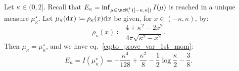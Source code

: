 \begin{proposition}
    \label{prop:mukappa_value}
    Let $\kappa \in (0,2]$.
    Recall that $E_\kappa = \inf_{\mu \in \mcM_1^+([-\kappa,\kappa])} I(\mu)$ is reached in a unique measure $\mu_\kappa^\star$.
    Let $\mu_\kappa(\mathrm{d} x) \coloneqq \rho_\kappa(x) \mathrm{d} x$ be given, for $x \in (-\kappa,\kappa)$, by:
    \begin{equation}\label{eq:def_rhokappa}
        \rho_\kappa(x) \coloneqq \frac{4+\kappa^2-2x^2}{4 \pi \sqrt{\kappa^2 - x^2}}. 
    \end{equation}
    Then $\mu_\kappa = \mu_\kappa^\star$, and we have eq.~\eqref{eq:to_prove_var_1st_mom}:
    \begin{equation*}
        E_\kappa = I(\mu_\kappa^\star) = - \frac{\kappa^4}{128} + \frac{\kappa^2}{8} - \frac{1}{2} \log \frac{\kappa}{2} - \frac{3}{8}.
    \end{equation*}
\end{proposition}
\noindent
